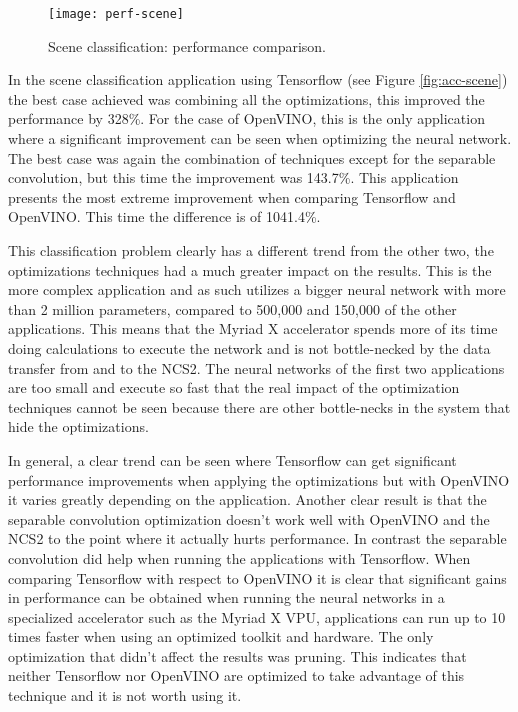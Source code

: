 \begin{figure}[thbp]
	\centering
	\texttt{[image: perf-scene]}
	\caption{Scene classification: performance comparison.}
	\label{fig:perf-scene}
\end{figure}

In the scene classification application using Tensorflow (see Figure \ref{fig:acc-scene}) the best case achieved was combining all the optimizations, this improved the performance by 328\%. For the case of OpenVINO, this is the only application where a significant improvement can be seen when optimizing the neural network. The best case was again the combination of techniques except for the separable convolution, but this time the improvement was 143.7\%. This application presents the most extreme improvement when comparing Tensorflow and OpenVINO. This time the difference is of 1041.4\%.

This classification problem clearly has a different trend from the other two, the optimizations techniques had a much greater impact on the results. This is the more complex application and as such utilizes a bigger neural network with more than 2 million parameters, compared to 500,000 and 150,000 of the other applications. This means that the Myriad X accelerator spends more of its time doing calculations to execute the network and is not bottle-necked by the data transfer from and to the NCS2. The neural networks of the first two applications are too small and execute so fast that the real impact of the optimization techniques cannot be seen because there are other bottle-necks in the system that hide the optimizations.

In general, a clear trend can be seen where Tensorflow can get significant performance improvements when applying the optimizations but with OpenVINO it varies greatly depending on the application. Another clear result is that the separable convolution optimization doesn't work well with OpenVINO and the NCS2 to the point where it actually hurts performance. In contrast the separable convolution did help when running the applications with Tensorflow. When comparing Tensorflow with respect to OpenVINO it is clear that significant gains in performance can be obtained when running the neural networks in a specialized accelerator such as the Myriad X VPU, applications can run up to 10 times faster when using an optimized toolkit and hardware. The only optimization that didn't affect the results was pruning. This indicates that neither Tensorflow nor OpenVINO are optimized to take advantage of this technique and it is not worth using it.

